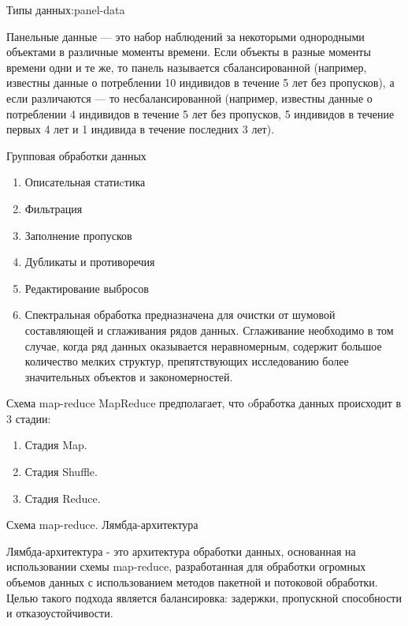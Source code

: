 \documentclass[10pt,pdf,hyperref={unicode}]{beamer}
\begin{document}
\begin{frame}{Типы данных:panel-data} 

Панельные данные —  это набор наблюдений за некоторыми однородными объектами в различные моменты времени. 
Если объекты в разные моменты времени одни и те же, то панель называется сбалансированной 
(например, известны данные о потреблении 10 индивидов в течение 5 лет без пропусков),
 а если различаются — то несбалансированной (например, известны данные о потреблении 4 индивидов в течение 
 5 лет без пропусков, 5 индивидов в течение первых 4 лет и 1 индивида в течение последних 3 лет). 
 
\end{frame}


\begin{frame}{Групповая обработки данных} 
\begin{enumerate}
\item Описательная статиcтика 
\item Фильтрация 
\item Заполнение пропусков
\item Дубликаты и противоречия
\item Редактирование выбросов 
\item Спектральная обработка предназначена для очистки от шумовой составляющей и сглаживания рядов данных. Сглаживание необходимо в том случае, когда ряд данных оказывается неравномерным, содержит большое количество мелких структур, препятствующих исследованию более значительных объектов и закономерностей. 


\end{enumerate}




\end{frame}




\begin{frame}{Схема map-reduce} 
MapReduce предполагает, что oбработка данных происходит в 3 стадии:
\begin{enumerate}

\item  Стадия Map.
\item   Стадия Shuffle.
\item   Стадия Reduce.
\end{enumerate}

\end{frame}

\begin{frame}{Схема map-reduce. Лямбда-архитектура  } 

Лямбда-архитектура - это архитектура обработки данных, основанная на  использовании схемы map-reduce, 
разработанная для обработки огромных объемов данных с использованием методов 
пакетной и потоковой обработки.
Целью такого  подхода  является балансировка:  задержки, 
пропускной способности и отказоустойчивости. 
\end{frame}
\end{document}
